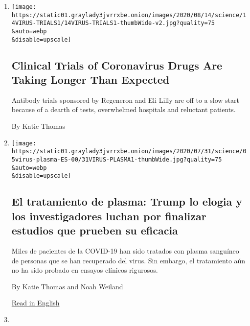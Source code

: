 \begin{enumerate}
\def\labelenumi{\arabic{enumi}.}
\item
  \href{/2020/08/14/health/covid-19-antibody-treatments.html}{}

  \texttt{[image: https://static01.graylady3jvrrxbe.onion/images/2020/08/14/science/14VIRUS-TRIALS1/14VIRUS-TRIALS1-thumbWide-v2.jpg?quality=75\\\&auto=webp\\\&disable=upscale]}

  \hypertarget{clinical-trials-of-coronavirus-drugs-are-taking-longer-than-expected}{%
  \subsection{Clinical Trials of Coronavirus Drugs Are Taking Longer
  Than
  Expected}\label{clinical-trials-of-coronavirus-drugs-are-taking-longer-than-expected}}

  Antibody trials sponsored by Regeneron and Eli Lilly are off to a slow
  start because of a dearth of tests, overwhelmed hospitals and
  reluctant patients.

  By Katie Thomas
\item
  \href{/es/2020/08/07/espanol/ciencia-y-tecnologia/plasma-convaleciente-coronavirus.html}{}

  \texttt{[image: https://static01.graylady3jvrrxbe.onion/images/2020/07/31/science/05virus-plasma-ES-00/31VIRUS-PLASMA1-thumbWide.jpg?quality=75\\\&auto=webp\\\&disable=upscale]}

  \hypertarget{el-tratamiento-de-plasma-trump-lo-elogia-y-los-investigadores-luchan-por-finalizar-estudios-que-prueben-su-eficacia}{%
  \subsection{El tratamiento de plasma: Trump lo elogia y los
  investigadores luchan por finalizar estudios que prueben su
  eficacia}\label{el-tratamiento-de-plasma-trump-lo-elogia-y-los-investigadores-luchan-por-finalizar-estudios-que-prueben-su-eficacia}}

  Miles de pacientes de la COVID-19 han sido tratados con plasma
  sanguíneo de personas que se han recuperado del virus. Sin embargo, el
  tratamiento aún no ha sido probado en ensayos clínicos rigurosos.

  By Katie Thomas and Noah Weiland

  \href{https://www.nytimes3xbfgragh.onion/2020/08/04/health/trump-plasma.html}{Read
  in English}
\item
  \href{/2020/08/04/health/trump-plasma.html}{}


\end{enumerate}
